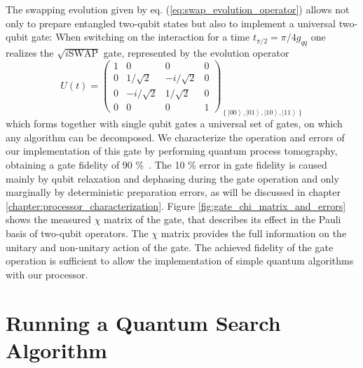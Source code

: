 The swapping evolution given by eq. (\ref{eq:swap_evolution_operator})
allows not only to prepare entangled two-qubit states but also to
implement a universal two-qubit gate:
When switching on the interaction for a time $t_{\pi/2}=\pi/4g_{qq}$ one
realizes the $\sqrt{i\mathrm{SWAP}}$ gate, represented
by the evolution operator
%
\begin{equation}
U(t)=\left(\begin{array}{cccc}
1 & 0 & 0 & 0\\
0 & 1/\sqrt{2} & -i/\sqrt{2} & 0\\
0 & -i/\sqrt{2} & 1/\sqrt{2} & 0\\
0 & 0 & 0 & 1\end{array}\right)_{\left\{ \left|00\right\rangle ,\left|01\right\rangle ,\left|10\right\rangle ,\left|11\right\rangle \right\} } \label{eq:sqrt_iswap_gate}
\end{equation}
%
which forms together with single qubit gates a universal set
of gates, on which any algorithm can be decomposed. We characterize
the operation and errors of our implementation of this gate by performing
quantum process tomography, obtaining a gate fidelity of 90 \%\ .
The 10 \% error in gate fidelity is caused mainly by qubit relaxation
and dephasing during the gate operation and only marginally by deterministic
preparation errors, as will be discussed in chapter \ref{chapter:processor_characterization}. Figure \ref{fig:gate_chi_matrix_and_errors}
shows the measured $\chi$ matrix of the gate, that describes its
effect in the Pauli basis of two-qubit operators. The $\chi$ matrix
provides the full information on the unitary and non-unitary action
of the gate. The achieved fidelity of the gate operation is sufficient
to allow the implementation of simple quantum algorithms with our
processor.


\section{Running a Quantum Search Algorithm}


